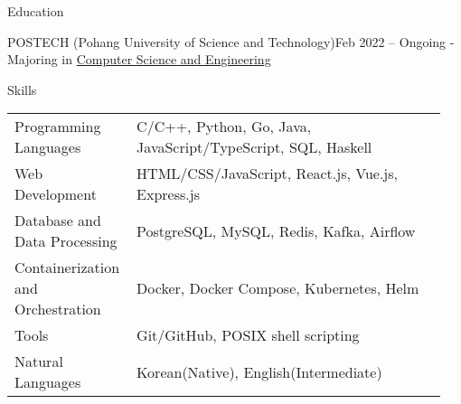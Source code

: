 \documentclass{resume}
\begin{document}
\begin{rSection}{Education}
    \begin{rSubsection}{POSTECH (Pohang University of Science and Technology)}{Feb 2022 -- Ongoing}
        - Majoring in \href{https://cse.postech.ac.kr}{Computer Science and Engineering} \\
    \end{rSubsection}
\end{rSection}

\begin{rSection}{Skills}
    \begin{tabular}{@{}p{0.25\linewidth}p{0.7\linewidth}}
        Programming Languages
            & C/C++, Python, Go, Java, JavaScript/TypeScript, SQL, Haskell \\ [0.5em]

        Web Development
            & HTML/CSS/JavaScript, React.js, Vue.js, Express.js \\ [0.5em]

        \raggedright Database and Data Processing
            & PostgreSQL, MySQL, Redis, Kafka, Airflow \\ [1.7em]

        \raggedright Containerization and Orchestration
            & Docker, Docker Compose, Kubernetes, Helm \\ [1.7em]

        Tools
            & Git/GitHub, POSIX shell scripting \\ [0.5em]

        Natural Languages
            & Korean(Native), English(Intermediate) \\ [0.5em]
    \end{tabular}
\end{rSection}
\end{document}
